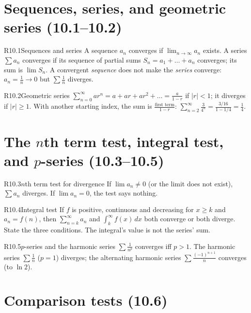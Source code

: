 \documentclass{apcalc}
\begin{document}
\section{Sequences, series, and geometric series (10.1--10.2)}

\begin{rulebox}{R10.1}{Sequences and series}
A sequence $a_n$ converges if $\lim_{n\to\infty}a_n$ exists. A series $\sum a_n$ converges if its sequence of partial sums $S_n=a_1+\dots+a_n$ converges; its sum is $\lim S_n$. A convergent \emph{sequence} does not make the \emph{series} converge: $a_n=\frac1n\to0$ but $\sum\frac1n$ diverges.
\end{rulebox}

\begin{rulebox}{R10.2}{Geometric series}
$\displaystyle\sum_{n=0}^{\infty}ar^n=a+ar+ar^2+\dots=\frac{a}{1-r}$ if $|r|<1$; it diverges if $|r|\ge1$. With another starting index, the sum is $\frac{\text{first term}}{1-r}$: $\sum_{n=2}^\infty\frac{3}{4^n}=\frac{3/16}{1-1/4}=\frac14$.
\end{rulebox}

\section{The $n$th term test, integral test, and $p$-series (10.3--10.5)}

\begin{rulebox}{R10.3}{$n$th term test for divergence}
If $\lim a_n\neq0$ (or the limit does not exist), $\sum a_n$ diverges. If $\lim a_n=0$, the test says nothing.
\end{rulebox}

\begin{rulebox}{R10.4}{Integral test}
If $f$ is positive, continuous and decreasing for $x\ge k$ and $a_n=f(n)$, then $\sum_{n=k}^\infty a_n$ and $\int_k^\infty f(x)\,dx$ both converge or both diverge. State the three conditions. The integral's value is not the series' sum.
\end{rulebox}

\begin{rulebox}{R10.5}{$p$-series and the harmonic series}
$\sum\frac{1}{n^p}$ converges iff $p>1$. The harmonic series $\sum\frac1n$ ($p=1$) diverges; the alternating harmonic series $\sum\frac{(-1)^{n+1}}{n}$ converges (to $\ln2$).
\end{rulebox}

\section{Comparison tests (10.6)}
\end{document}
